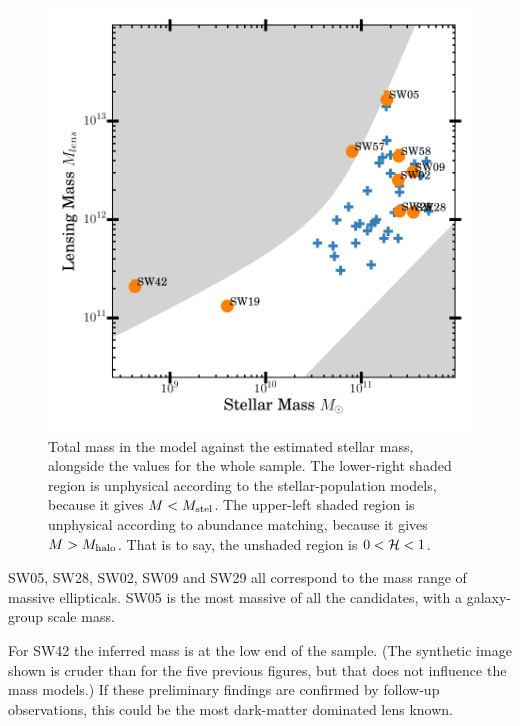 \begin{figure}
\includegraphics[width=\linewidth]{img/mlens_vs_mstel_one/mstel_vs_mtot_one}
\caption{Total mass in the model against the estimated stellar mass,
  alongside the values for the whole sample.  The lower-right shaded
  region is unphysical according to the stellar-population models,
  because it gives $M<M_\text{stel}$. The upper-left shaded region is
  unphysical according to abundance matching, because it gives
  $M>M_\text{halo}$.  That is to say, the unshaded region is
  $0<\mathcal{H}<1$. \label{fig:stelmass}}
\end{figure}

SW05, SW28, SW02, SW09 and SW29 all correspond to the mass range of
massive ellipticals.  SW05 is the most massive of all the candidates,
with a galaxy-group scale mass.

For SW42 the inferred mass is at the low end of the sample.  (The
synthetic image shown is cruder than for the five previous figures,
but that does not influence the mass models.)  If these preliminary
findings are confirmed by follow-up observations, this could be the
most dark-matter dominated lens known.


